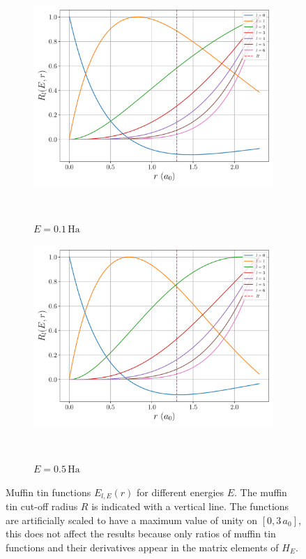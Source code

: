 \documentclass[a4paper,DIV=12,english]{scrartcl}
\begin{document}
\begin{figure}
\begin{subfigure}{0.49\textwidth}
        \centering 
        \includegraphics[width=\textwidth]{../plots/mtins/0.1.pdf}
        \caption{$E = 0.1 \, \text{Ha}$}\
        \label{subfig:mtin_0.1}
    \end{subfigure}
    \begin{subfigure}{0.49\textwidth}
        \centering 
        \includegraphics[width=\textwidth]{../plots/mtins/0.5.pdf}
        \caption{$E = 0.5 \, \text{Ha}$}\
        \label{subfig:mtin_-0.5}
    \end{subfigure}
    \caption{Muffin tin functions $E_{l,E}(r)$ for different energies $E$. The muffin tin cut-off radius $R$ is indicated with a vertical line. The functions are artificially scaled to have a maximum value of unity on $[0, 3\,a_0]$, this does not affect the results because only ratios of muffin tin functions and their derivatives appear in the matrix elements of $H_E$.}
    \label{fig:mtins}
\end{figure}
\end{document}

